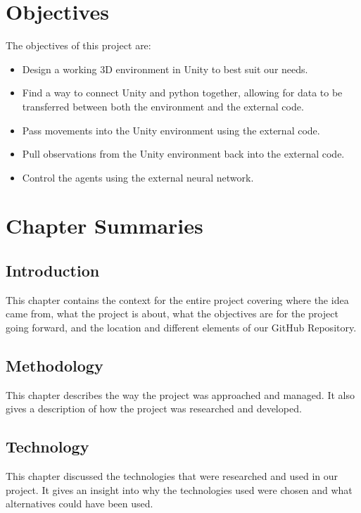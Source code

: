 
\section{Objectives}
The objectives of this project are:

\begin{itemize}
    \item{Design a working 3D environment in Unity to best suit our needs.}
    \item{Find a way to connect Unity and python together, allowing for data to be transferred between both the environment and the external code.}
    \item{Pass movements into the Unity environment using the external code.}
    \item{Pull observations from the Unity environment back into the external code.}
    \item{Control the agents using the external neural network.}
\end{itemize}

\section{Chapter Summaries}

\subsection{Introduction}
This chapter contains the context for the entire project covering where the idea came from, what the project is about, what the objectives are for the project going forward, and the location and different elements of our GitHub Repository.

\subsection{Methodology}
This chapter describes the way the project was approached and managed. It also gives a description of how the project was researched and developed.

\subsection{Technology}
This chapter discussed the technologies that were researched and used in our project. It gives an insight into why the technologies used were chosen and what alternatives could have been used.

